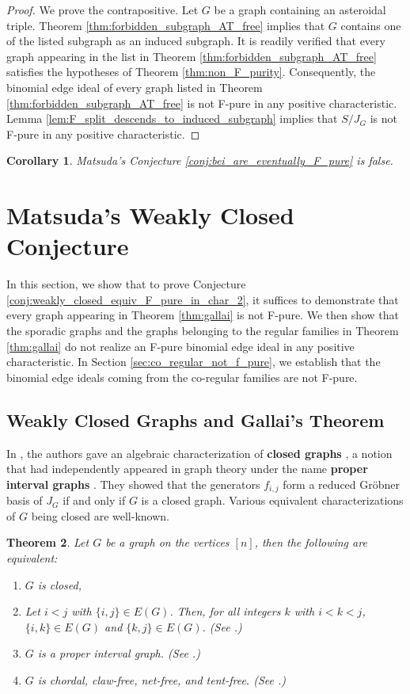\documentclass[12pt,a4paper]{amsart}
\theoremstyle{plain}
\newtheorem{thrm}{Theorem}[section]
\def\bthm{\begin{thrm}}
\def\ethm{\end{thrm}}
\newtheorem{cor}[thrm]{Corollary}
\def\bcor{\begin{cor}}
\def\ecor{\end{cor}}
\theoremstyle{definition}
\def\bproof{\begin{proof}}
\def\eproof{\end{proof}}
\theoremstyle{remark}
\begin{document}
\bproof
We prove the contrapositive. Let $G$ be a graph containing an asteroidal triple. Theorem \ref{thm:forbidden_subgraph_AT_free} implies that $G$ contains one of the listed subgraph as an induced subgraph. It is readily verified that every graph appearing in the list in Theorem \ref{thm:forbidden_subgraph_AT_free} satisfies the hypotheses of Theorem \ref{thm:non_F_purity}. Consequently, the binomial edge ideal of every graph listed in Theorem \ref{thm:forbidden_subgraph_AT_free} is not F-pure in any positive characteristic. Lemma \ref{lem:F_split_descends_to_induced_subgraph} implies that $S/J_{G}$ is not F-pure in any positive characteristic.
\eproof

\bcor
Matsuda's Conjecture \ref{conj:bei_are_eventually_F_pure} is false.
\ecor 

\section{Matsuda's Weakly Closed Conjecture}
\label{sec:Matsuda_conj}

In this section, we show that to prove Conjecture \ref{conj:weakly_closed_equiv_F_pure_in_char_2}, it suffices to demonstrate that every graph appearing in Theorem \ref{thm:gallai} is not F-pure. We then show that the sporadic graphs and the graphs belonging to the regular families in Theorem \ref{thm:gallai} do not realize an F-pure binomial edge ideal in any positive characteristic. In Section \ref{sec:co_regular_not_f_pure}, we establish that the binomial edge ideals coming from the co-regular families are not F-pure.


\subsection{Weakly Closed Graphs and Gallai's Theorem}

In \cite{herzog2010binomial}, the authors gave an algebraic characterization of \textbf{closed graphs} {\cite[Theorem 1.1]{herzog2010binomial}}, a notion that had independently appeared in graph theory under the name \textbf{proper interval graphs} \cite[Theorem 2.4]{crupi2014closedProperInteval}. They showed that the generators $f_{i,j}$ form a reduced Gr\"obner basis of $J_{G}$ if and only if $G$ is a closed graph. Various equivalent characterizations of $G$ being closed are well-known.

\bthm
\label{thm:closed_graphs}
Let $G$ be a graph on the vertices $[n]$, then the following are equivalent:
\begin{enumerate}
    \item $G$ is closed,
    \item Let $i < j$ with $\{i,j\} \in E(G)$. Then, for all integers $k$ with $i < k < j$, $\{i,k\} \in E(G)$ and $\{k,j\} \in E(G)$. (See {\cite[Proposition 4.8]{crupi2010binomial}}.)
    \item $G$ is a proper interval graph. (See {\cite[Theorem  2.4]{crupi2014closedProperInteval}}.)
    \item $G$ is chordal, claw-free, net-free, and tent-free. (See {\cite[Theorem 7.10]{herzog2018binomial}}.)
\end{enumerate}
\ethm 
\end{document}
